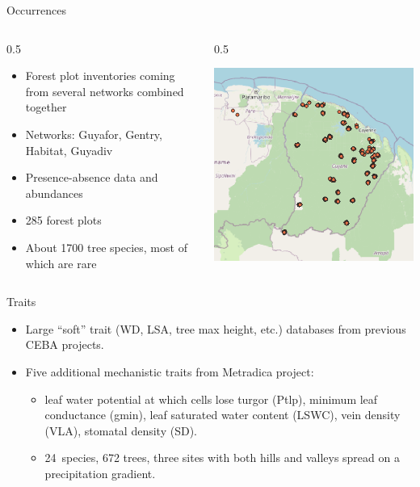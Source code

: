 \documentclass[
  10pt,
  ignorenonframetext,
  table, dvipsname, compress]{beamer}
\providecommand{\tightlist}{%
  \setlength{\itemsep}{0pt}\setlength{\parskip}{0pt}}
\def\bcols{\begin{columns}}
\def\bcol{\begin{column}}
\def\ecol{\end{column}}
\def\ecols{\end{columns}}
\begin{document}
\begin{frame}{Occurrences}
\protect\hypertarget{occurrences}{}
\bcols
\bcol{0.5\textwidth}

\begin{itemize}
\tightlist
\item
  Forest plot inventories coming from several networks combined together
\item
  Networks: Guyafor, Gentry, Habitat, Guyadiv
\item
  Presence-absence data and abundances
\item
  285 forest plots
\item
  About 1700 tree species, most of which are rare
\end{itemize}

\ecol
\bcol{0.5\textwidth}

\includegraphics[width=\textwidth]{figs/inventories} \ecol \ecols
\end{frame}

\begin{frame}{Traits}
\protect\hypertarget{traits}{}
\begin{itemize}
\tightlist
\item
  Large ``soft'' trait (WD, LSA, tree max height, etc.) databases from
  previous CEBA projects.
\item
  Five additional mechanistic traits from Metradica project:

  \begin{itemize}
  \tightlist
  \item
    leaf water potential at which cells lose turgor (Ptlp), minimum leaf
    conductance (gmin), leaf saturated water content (LSWC), vein
    density (VLA), stomatal density (SD).
  \item
    24~species, 672 trees, three sites with both hills and valleys
    spread on a precipitation gradient.
  \end{itemize}
\end{itemize}
\end{frame}
\end{document}
